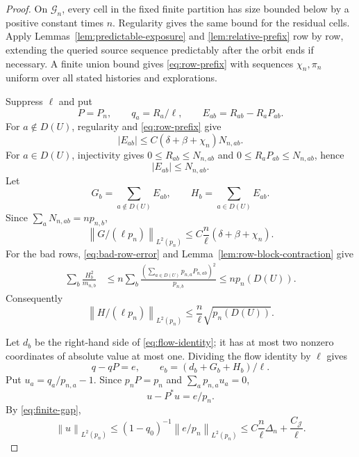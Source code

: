 \documentclass[11pt]{article}
\theoremstyle{definition}
\theoremstyle{remark}
\newcommand{\cG}{\mathcal G}
\newcommand{\cJ}{\mathcal J}
\newcommand{\norm}[1]{\left\lVert#1\right\rVert}
\begin{document}
\begin{proof}
On $\cG_n$, every cell in the fixed finite partition has size bounded below by
a positive constant times $n$.  Regularity gives the same bound for the
residual cells.  Apply Lemmas~\ref{lem:predictable-exposure} and
\ref{lem:relative-prefix} row by row, extending the queried source sequence
predictably after the orbit ends if necessary.  A finite union bound gives
\eqref{eq:row-prefix} with sequences $\chi_n,\pi_n$ uniform over all stated
histories and explorations.

Suppress $\ell$ and put
\[
 P=P_n,
 \qquad q_a=R_a/\ell,
 \qquad E_{ab}=R_{ab}-R_aP_{ab}.
\]
For $a\notin D(U)$, regularity and \eqref{eq:row-prefix} give
\begin{equation}
 |E_{ab}|\le C(\delta+\beta+\chi_n)N_{n,ab}.
 \label{eq:good-row-error}
\end{equation}
For $a\in D(U)$, injectivity gives
$0\le R_{ab}\le N_{n,ab}$ and
$0\le R_aP_{ab}\le N_{n,ab}$, hence
\begin{equation}
 |E_{ab}|\le N_{n,ab}.
 \label{eq:bad-row-error}
\end{equation}
Let
\[
 G_b=\sum_{a\notin D(U)}E_{ab},
 \qquad H_b=\sum_{a\in D(U)}E_{ab}.
\]
Since $\sum_aN_{n,ab}=np_{n,b}$,
\begin{equation}
 \norm{G/(\ell p_n)}_{L^2(p_n)}
 \le C\frac n\ell(\delta+\beta+\chi_n).
 \label{eq:good-L2}
\end{equation}
For the bad rows, \eqref{eq:bad-row-error} and
Lemma~\ref{lem:row-block-contraction} give
\begin{align}
 \sum_b\frac{H_b^2}{m_{n,b}}
 &\le n\sum_b
 \frac{(\sum_{a\in D(U)}p_{n,a}P_{n,ab})^2}{p_{n,b}}
 \le n p_n(D(U)).
 \label{eq:bad-L2-raw}
\end{align}
Consequently
\begin{equation}
 \norm{H/(\ell p_n)}_{L^2(p_n)}
 \le\frac n\ell\sqrt{p_n(D(U))}.
 \label{eq:bad-L2}
\end{equation}

Let $d_b$ be the right-hand side of \eqref{eq:flow-identity}; it has at most
two nonzero coordinates of absolute value at most one.  Dividing the flow
identity by $\ell$ gives
\[
 q-qP=e,
 \qquad e_b=(d_b+G_b+H_b)/\ell.
\]
Put $u_a=q_a/p_{n,a}-1$.  Since $p_nP=p_n$ and
$\sum_ap_{n,a}u_a=0$,
\begin{equation}
 u-P^*u=e/p_n.
 \label{eq:resolvent}
\end{equation}
By \eqref{eq:finite-gap},
\begin{equation}
 \norm{u}_{L^2(p_n)}
 \le(1-q_0)^{-1}\norm{e/p_n}_{L^2(p_n)}
 \le C\frac n\ell\Delta_n+\frac{C_{\cJ}}\ell.
 \label{eq:u-L2}
\end{equation}


\end{proof}
\end{document}
